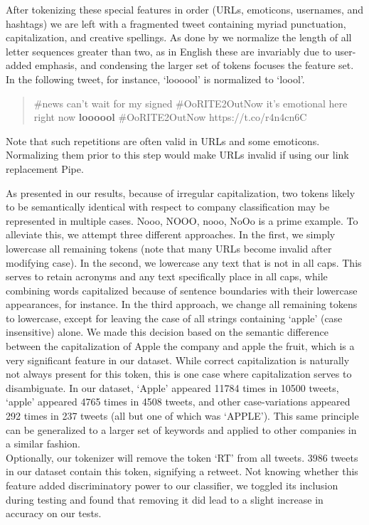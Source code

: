 \documentclass[letterpaper]{article}
\begin{document}
After tokenizing these special features in order (URLs, emoticons, usernames, and hashtags) we are left with a fragmented tweet containing myriad punctuation, capitalization, and creative spellings. As done by \citet{potts2011} we normalize the length of all letter sequences greater than two, as in English these are invariably due to user-added emphasis, and condensing the larger set of tokens focuses the feature set. In the following tweet, for instance, `loooool' is normalized to `loool'.
\begin{quote}
\#news can't wait for my signed \#OoRITE2OutNow it's emotional here right now \textbf{loooool} \#OoRITE2OutNow https://t.co/r4n4cn6C 
\end{quote}

Note that such repetitions are often valid in URLs and some emoticons. Normalizing them prior to this step would make URLs invalid if using our link replacement Pipe.

As presented in our results, because of irregular capitalization, two tokens likely to be semantically identical with respect to company classification may be represented in multiple cases. {Nooo, NOOO, nooo, NoOo} is a prime example. To alleviate this, we attempt three different approaches. In the first, we simply lowercase all remaining tokens (note that many URLs become invalid after modifying case). In the second, we lowercase any text that is not in all caps. This serves to retain acronyms and any text specifically place in all caps, while combining words capitalized because of sentence boundaries with their lowercase appearances, for instance. In the third approach, we change all remaining tokens to lowercase, except for leaving the case of all strings containing `apple' (case insensitive) alone. We made this decision based on the semantic difference between the capitalization of Apple the company and apple the fruit, which is a very significant feature in our dataset. While correct capitalization is naturally not always present for this token, this is one case where capitalization serves to disambiguate. In our dataset, `Apple' appeared 11784 times in 10500 tweets, `apple' appeared 4765 times in 4508 tweets, and other case-variations appeared 292 times in 237 tweets (all but one of which was `APPLE'). This same principle can be generalized to a larger set of keywords and applied to other companies in a similar fashion. \\

Optionally, our tokenizer will remove the token `RT' from all tweets. 3986 tweets in our dataset contain this token, signifying a retweet. Not knowing whether this feature added discriminatory power to our classifier, we toggled its inclusion during testing and found that removing it did lead to a slight increase in accuracy on our tests.\\
\end{document}
